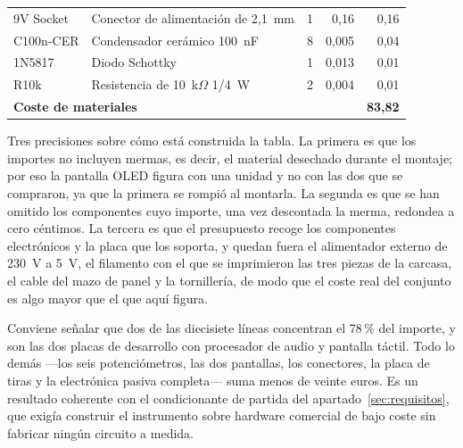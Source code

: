 \begin{table}[htbp]
\begin{tabular}{llrrr}
        9V Socket           & Conector de alimentación de 2,1~mm  & 1 &  0,16 &  0,16 \\
        C100n-CER           & Condensador cerámico 100~nF         & 8 &  0,005 & 0,04 \\
        1N5817              & Diodo Schottky                      & 1 &  0,013 & 0,01 \\
        R10k                & Resistencia de 10~k$\Omega$ 1/4~W   & 2 &  0,004 & 0,01 \\
        \midrule
        \multicolumn{4}{l}{\textbf{Coste de materiales}} & \textbf{83,82} \\
        \bottomrule
    \end{tabular}
\end{table}

Tres precisiones sobre cómo está construida la tabla. La primera es que los
importes no incluyen mermas, es decir, el material desechado durante el montaje;
por eso la pantalla OLED figura con una unidad y no con las dos que se
compraron, ya que la primera se rompió al montarla. La segunda es que se han
omitido los componentes cuyo importe, una vez descontada la merma, redondea a
cero céntimos. La tercera es que el presupuesto recoge los componentes
electrónicos y la placa que los soporta, y quedan fuera el alimentador externo
de 230~V a 5~V, el filamento con el que se imprimieron las tres piezas de la
carcasa, el cable del mazo de panel y la tornillería, de modo que el coste real
del conjunto es algo mayor que el que aquí figura.

Conviene señalar que dos de las diecisiete líneas concentran el 78\,\% del
importe, y son las dos placas de desarrollo con procesador de audio y pantalla
táctil. Todo lo demás —los seis potenciómetros, las dos pantallas, los
conectores, la placa de tiras y la electrónica pasiva completa— suma menos de
veinte euros. Es un resultado coherente con el condicionante de partida del
apartado~\ref{sec:requisitos}, que exigía construir el instrumento sobre
hardware comercial de bajo coste sin fabricar ningún circuito a medida.
